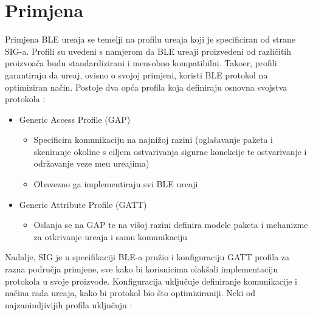 \section{Primjena}
Primjena BLE ure\dj aja se temelji na profilu ure\dj aja koji je specificiran od strane SIG-a. Profili su uvedeni s namjerom da BLE ure\dj aji proizvedeni od razli\v{c}itih proizvo\dj a\v{c}a budu standardizirani i me\dj usobno kompatibilni. Tako\dj er, profili garantiraju da ure\dj aj, ovisno o svojoj primjeni, koristi BLE protokol na optimiziran na\v{c}in. Postoje dva op\'{c}a profila koja definiraju osnovna svojstva protokola \cite{ble_getting_started}:

\begin{itemize}
	\item Generic Access Profile (GAP)
	\begin{itemize}
		\item Specificira komunikaciju na najni\v{z}oj razini (ogla\v{s}avanje paketa i skeniranje okoline s ciljem ostvarivanja sigurne konekcije te ostvarivanje i odr\v{z}avanje veze me\dj u ure\dj ajima)
		\item Obavezno ga implementiraju svi BLE ure\dj aji
	\end{itemize}
	\item Generic Attribute Profile (GATT)
	\begin{itemize}
		\item Oslanja se na GAP te na vi\v{s}oj razini definira modele paketa i mehanizme za otkrivanje ure\dj aja i samu komunikaciju
	\end{itemize}
\end{itemize}

Nadalje, SIG je u specifikaciji BLE-a pru\v{z}io i konfiguraciju GATT profila za razna podru\v{c}ja primjene, sve kako bi korisnicima olak\v{s}ali implementaciju protokola u svoje proizvode. Konfiguracija uklju\v{c}uje definiranje komunikacije i na\v{c}ina rada ure\dj aja, kako bi protokol bio \v{s}to optimiziraniji. Neki od najzanimljivijih profila uklju\v{c}uju \cite{ble_profiles}: 


